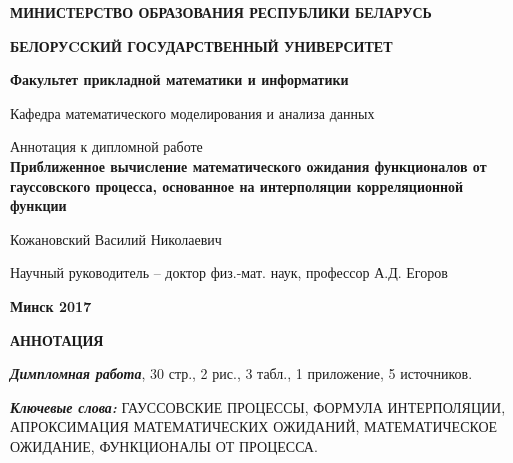\documentclass [a4paper, 12pt]{report}
\begin{document}
\thispagestyle{empty}
\begin{normalsize}
	\begin{center}
		{\bf МИНИСТЕРСТВО ОБРАЗОВАНИЯ РЕСПУБЛИКИ БЕЛАРУСЬ}
	\end{center}

	\begin{center}
		{\bf БЕЛОРУCСКИЙ ГОСУДАРСТВЕННЫЙ УНИВЕРСИТЕТ}
	\end{center}

	\begin{center}
		{\bf Факультет прикладной математики и информатики}
	\end{center}

	\begin{center}
		Кафедра математического моделирования и анализа данных
	\end{center}
\end{normalsize}
\bigskip
\bigskip
\bigskip
\bigskip
\bigskip
\bigskip

\begin{center}
	Аннотация к дипломной работе \\
	{\bf Приближенное вычисление математического ожидания функционалов от гауссовского процесса, основанное на интерполяции корреляционной функции}
\end{center}
\bigskip
\bigskip
\bigskip
\bigskip

\begin{center}
	Кожановский Василий Николаевич
\end{center}

\bigskip
\bigskip
\bigskip
\bigskip

\begin{center}
	Научный руководитель – доктор физ.-мат. наук, профессор А.Д. Егоров
\end{center}

\bigskip
\bigskip
\bigskip
\bigskip

\begin{center}
	\bf{Минск 2017}
\end{center}

\newpage

\begin{center}
	\textbf{АННОТАЦИЯ}
\end{center}

\emph{\textbf{Димпломная работа}}, 30 стр., 2 рис., 3 табл., 1 приложение, 5 источников.

\emph{\textbf{Ключевые слова:}} ГАУССОВСКИЕ ПРОЦЕССЫ, ФОРМУЛА ИНТЕРПОЛЯЦИИ, АПРОКСИМАЦИЯ МАТЕМАТИЧЕСКИХ ОЖИДАНИЙ, МАТЕМАТИЧЕСКОЕ ОЖИДАНИЕ, ФУНКЦИОНАЛЫ ОТ ПРОЦЕССА.
\end{document}
